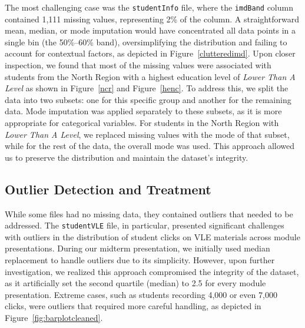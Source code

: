 The most challenging case was the \texttt{studentInfo} file, where the \texttt{imdBand} column contained 1,111 missing values, representing 2\% of the column. A straightforward mean, median, or mode imputation would have concentrated all data points in a single bin (the 50\%–60\% band), oversimplifying the distribution and failing to account for contextual factors, as depicted in Figure~\ref{clutteredimd}. Upon closer inspection, we found that most of the missing values were associated with students from the North Region with a highest education level of \textit{Lower Than A Level} as shown in Figure~\ref{ncr} and Figure~\ref{henc}. To address this, we split the data into two subsets: one for this specific group and another for the remaining data. Mode imputation was applied separately to these subsets, as it is more appropriate for categorical variables. For students in the North Region with \textit{Lower Than A Level}, we replaced missing values with the mode of that subset, while for the rest of the data, the overall mode was used. This approach allowed us to preserve the distribution and maintain the dataset's integrity.

\subsection*{Outlier Detection and Treatment}

While some files had no missing data, they contained outliers that needed to be addressed. The \texttt{studentVLE} file, in particular, presented significant challenges with outliers in the distribution of student clicks on VLE materials across module presentations. During our midterm presentation, we initially used median replacement to handle outliers due to its simplicity. However, upon further investigation, we realized this approach compromised the integrity of the dataset, as it artificially set the second quartile (median) to 2.5 for every module presentation. Extreme cases, such as students recording 4,000 or even 7,000 clicks, were outliers that required more careful handling, as depicted in Figure~\ref{fig:barplotcleaned}.

